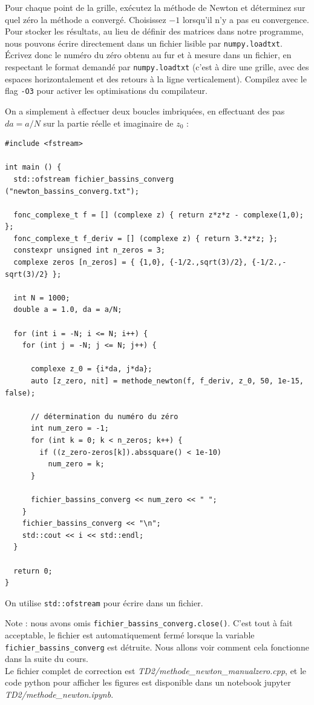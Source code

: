\documentclass{book}
\newcommand{\inline}[1]{\texttt{#1}}
\def\filename{\emph}
\begin{document}
Pour chaque point de la grille, exécutez la méthode de Newton et déterminez sur quel zéro la méthode a convergé. Choisissez $-1$ lorsqu'il n'y a pas eu convergence. Pour stocker les résultats, au lieu de définir des matrices dans notre programme, nous pouvons écrire directement dans un fichier lisible par \texttt{numpy.loadtxt}. Écrivez donc le numéro du zéro obtenu au fur et à mesure dans un fichier, en respectant le format demandé par \texttt{numpy.loadtxt} (c'est à dire une grille, avec des espaces horizontalement et des retours à la ligne verticalement). Compilez avec le flag \texttt{-O3} pour activer les optimisations du compilateur.\\

\begin{correction}
On a simplement à effectuer deux boucles imbriquées, en effectuant des pas $da=a/N$ sur la partie réelle et imaginaire de $z_0$ :
\begin{verbatim}
#include <fstream>

int main () {
  std::ofstream fichier_bassins_converg ("newton_bassins_converg.txt");

  fonc_complexe_t f = [] (complexe z) { return z*z*z - complexe(1,0); };
  fonc_complexe_t f_deriv = [] (complexe z) { return 3.*z*z; };
  constexpr unsigned int n_zeros = 3;
  complexe zeros [n_zeros] = { {1,0}, {-1/2.,sqrt(3)/2}, {-1/2.,-sqrt(3)/2} };

  int N = 1000;
  double a = 1.0, da = a/N;

  for (int i = -N; i <= N; i++) {
    for (int j = -N; j <= N; j++) {

      complexe z_0 = {i*da, j*da};
      auto [z_zero, nit] = methode_newton(f, f_deriv, z_0, 50, 1e-15, false);

      // détermination du numéro du zéro
      int num_zero = -1;
      for (int k = 0; k < n_zeros; k++) {
        if ((z_zero-zeros[k]).abssquare() < 1e-10)
          num_zero = k;
      }

      fichier_bassins_converg << num_zero << " ";
    }
    fichier_bassins_converg << "\n";
    std::cout << i << std::endl;
  }

  return 0;
}
\end{verbatim}

On utilise \inline{std::ofstream} pour écrire dans un fichier.

Note : nous avons omis \inline{fichier_bassins_converg.close()}. C'est tout à fait acceptable, le fichier est automatiquement fermé lorsque la variable \inline{fichier_bassins_converg} est détruite. Nous allons voir comment cela fonctionne dans la suite du cours.\\

Le fichier complet de correction est \filename{TD2/methode\_newton\_manualzero.cpp}, et le code python pour afficher les figures est disponible dans un notebook jupyter \filename{TD2/methode\_newton.ipynb}.

\end{correction}
\end{document}
